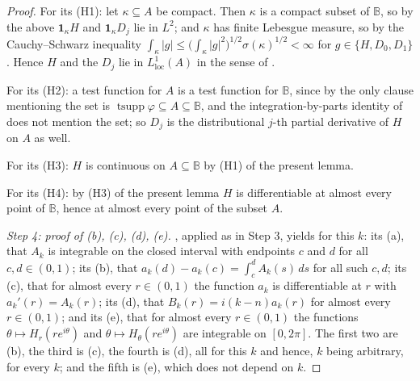 \begin{proof}
For its (H1): let $\kappa\subseteq A$ be compact.  Then $\kappa$ is a compact
subset of $\mathbb{B}$, so by the above $\mathbf1_\kappa H$ and
$\mathbf1_\kappa D_j$ lie in $L^{2}$; and $\kappa$ has finite Lebesgue measure,
so by the Cauchy--Schwarz inequality $\int_\kappa|g|\le
\bigl(\int_\kappa|g|^{2}\bigr)^{1/2}\sigma(\kappa)^{1/2}<\infty$ for
$g\in\{H,D_0,D_1\}$.  Hence $H$ and the $D_j$ lie in $L^{1}_{\mathrm{loc}}(A)$
in the sense of .

For its (H2): a test function for $A$ is a test function for $\mathbb{B}$,
since by  the only clause mentioning the set is
$\operatorname{tsupp}\varphi\subseteq A\subseteq\mathbb{B}$, and the
integration-by-parts identity of  does not mention the
set; so $D_j$ is the distributional $j$-th partial derivative of $H$ on $A$ as
well.

For its (H3): $H$ is continuous on $A\subseteq\mathbb{B}$ by (H1) of the
present lemma.

For its (H4): by (H3) of the present lemma $H$ is differentiable at almost
every point of $\mathbb{B}$, hence at almost every point of the subset $A$.

\emph{Step 4: proof of (b), (c), (d), (e).}  ,
applied as in Step 3, yields for this $k$: its (a), that $A_k$ is integrable on
the closed interval with endpoints $c$ and $d$ for all $c,d\in(0,1)$; its (b),
that $a_k(d)-a_k(c)=\int_c^dA_k(s)\,ds$ for all such $c,d$; its (c), that for
almost every $r\in(0,1)$ the function $a_k$ is differentiable at $r$ with
$a_k'(r)=A_k(r)$; its (d), that $B_k(r)=i(k-n)a_k(r)$ for almost every
$r\in(0,1)$; and its (e), that for almost every $r\in(0,1)$ the functions
$\theta\mapsto H_r(re^{i\theta})$ and $\theta\mapsto H_\theta(re^{i\theta})$ are
integrable on $[0,2\pi]$.  The first two are (b), the third is (c), the fourth
is (d), all for this $k$ and hence, $k$ being arbitrary, for every $k$; and the
fifth is (e), which does not depend on $k$.


\end{proof}
